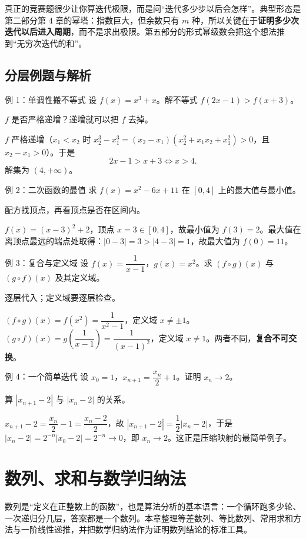 \begin{tip}[迭代在竞赛里的样子]
真正的竞赛题很少让你算迭代极限，而是问“迭代多少步以后会怎样”。典型形态是第二部分第 4 章的幂塔：指数巨大，但余数只有 $m$ 种，所以关键在于\textbf{证明多少次迭代以后进入周期}，而不是求出极限。第五部分的形式幂级数会把这个想法推到“无穷次迭代的和”。
\end{tip}

\section{分层例题与解析}
\begin{problem}{例 1：单调性搬不等式}
设 $f(x)=x^3+x$。解不等式 $f(2x-1)>f(x+3)$。
\end{problem}
\hint $f$ 是否严格递增？递增就可以把 $f$ 去掉。

\sol $f$ 严格递增（$x_1<x_2$ 时 $x_2^3-x_1^3=(x_2-x_1)(x_2^2+x_1x_2+x_1^2)>0$，且 $x_2-x_1>0$）。于是
\[
2x-1>x+3\iff x>4.
\]
解集为 $(4,+\infty)$。

\begin{problem}{例 2：二次函数的最值}
求 $f(x)=x^2-6x+11$ 在 $[0,4]$ 上的最大值与最小值。
\end{problem}
\hint 配方找顶点，再看顶点是否在区间内。

\sol $f(x)=(x-3)^2+2$，顶点 $x=3\in[0,4]$，故最小值为 $f(3)=2$。最大值在离顶点最远的端点处取得：$|0-3|=3>|4-3|=1$，故最大值为 $f(0)=11$。

\begin{problem}{例 3：复合与定义域}
设 $f(x)=\dfrac1{x-1}$，$g(x)=x^2$。求 $(f\circ g)(x)$ 与 $(g\circ f)(x)$ 及其定义域。
\end{problem}
\hint 逐层代入；定义域要逐层检查。

\sol $(f\circ g)(x)=f(x^2)=\dfrac1{x^2-1}$，定义域 $x\ne\pm1$。$(g\circ f)(x)=g\!\left(\dfrac1{x-1}\right)=\dfrac1{(x-1)^2}$，定义域 $x\ne1$。两者不同，\textbf{复合不可交换}。

\begin{problem}{例 4：一个简单迭代}
设 $x_0=1$，$x_{n+1}=\dfrac{x_n}{2}+1$。证明 $x_n\to2$。
\end{problem}
\hint 算 $|x_{n+1}-2|$ 与 $|x_n-2|$ 的关系。

\sol $x_{n+1}-2=\dfrac{x_n}{2}-1=\dfrac{x_n-2}{2}$，故 $|x_{n+1}-2|=\dfrac12|x_n-2|$，于是 $|x_n-2|=2^{-n}|x_0-2|=2^{-n}\to0$，即 $x_n\to2$。这正是压缩映射的最简单例子。

\chapter{数列、求和与数学归纳法}
\begin{chapterintro}[章节导读]
数列是“定义在正整数上的函数”，也是算法分析的基本语言：一个循环跑多少轮、一次递归分几层，答案都是一个数列。本章整理等差数列、等比数列、常用求和方法与一阶线性递推，并把数学归纳法作为证明数列结论的标准工具。
\end{chapterintro}

